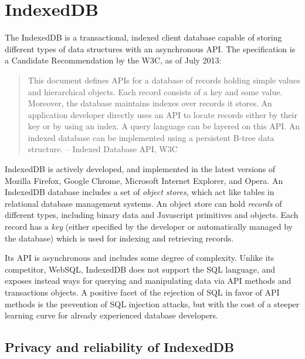 \section{IndexedDB}  
The IndexedDB is a transactional, indexed client database capable of storing different types of data structures with an asynchronous API. The specification is a Candidate Recommendation by the W3C, as of July 2013:

\begin{quote}
This document defines APIs for a database of records holding simple values and hierarchical objects. Each record consists of a key and some value. Moreover, the database maintains indexes over records it stores. An application developer directly uses an API to locate records either by their key or by using an index. A query language can be layered on this API. An indexed database can be implemented using a persistent B-tree data structure.
– Indexed Database API, W3C
\end{quote}

IndexedDB is actively developed, and implemented in the latest versions of Mozilla Firefox, Google Chrome, Microsoft Internet Explorer, and Opera. An IndexedDB database includes a set of \emph{object stores}, which act like tables in relational database management systems. An object store can hold \emph{records} of different types, including binary data and Javascript primitives and objects. Each record has a \emph{key} (either specified by the developer or automatically managed by the database) which is used for indexing and retrieving records.

Its API is asynchronous and includes some degree of complexity. Unlike its competitor, WebSQL, IndexedDB does not support the SQL language, and exposes instead ways for querying and manipulating data via API methods and transactions objects. A positive facet of the rejection of SQL in favor of API methods is the prevention of SQL injection attacks, but with the cost of a steeper learning curve for already experienced database developers.

\subsection{Privacy and reliability of IndexedDB}


